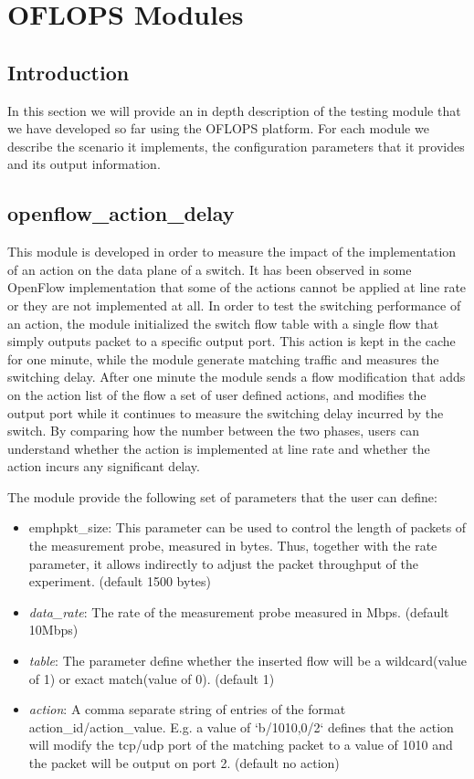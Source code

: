 \documentclass{book}
\begin{document}
\chapter{OFLOPS Modules}
\label{oflops-modules}

\section{Introduction}

In this section we will provide an in depth description of the testing module
that we have developed  so far using the OFLOPS platform. For each module we describe
the scenario it implements, the configuration parameters that it provides and
its output information. 

\section{openflow\_action\_delay}        

This module is developed in order to measure the impact of the implementation 
of an action on the data plane of a switch. It has been observed in 
some OpenFlow implementation that some of the actions cannot be applied at 
line rate or they are not implemented at all. In order to test the switching
performance of an action, the module initialized the switch flow table with a
single flow that simply outputs packet to a specific output port. This action is
kept in the cache for one minute, while the module generate matching traffic and
measures the switching delay. After one minute the module sends a flow
modification that adds on the action list of the flow a set of user defined
actions, and modifies the output port while it continues to measure the switching 
delay incurred by the switch. By comparing how the number between the two
phases, users can understand whether the action is implemented at line rate and
whether the action incurs any significant delay. 

The module provide the following set of parameters that the user can define:
\begin{itemize}
\item emph{pkt\_size}: This parameter can be used to control the length of
packets of the measurement probe, measured in bytes. Thus, together with the 
  rate parameter, it allows indirectly to adjust the packet throughput of the 
experiment. (default 1500 bytes)
  \item \emph{data\_rate}: The rate of the measurement probe measured in Mbps.
(default 10Mbps) 
  \item \emph{table}: The parameter define whether the inserted flow will be 
a wildcard(value of 1) or exact match(value of 0).  (default 1)
  \item \emph{action}:  A comma separate string of entries of the format
  action\_id/action\_value. E.g. a value of `b/1010,0/2` defines that the action
  will modify the tcp/udp port of the matching packet to a value of 1010 and the
packet will be output on port 2. (default no action)
  \end{itemize}
\end{document}
